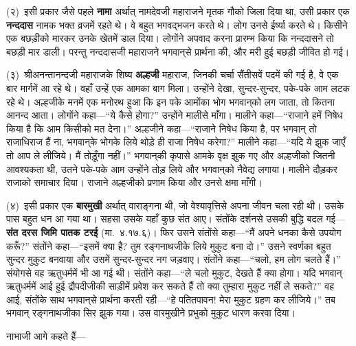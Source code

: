 \begin{sloppypar}\justifying{}
(२)~इसी प्रकार जैसे पहले \textbf{नामा} अर्थात् नामदेवजी महाराजने मृतक गौको जिला दिया था, उसी प्रकार एक \textbf{नन्ददास} नामक भक्त व्रजमें रहते थे। वे बहुत भगवद्भजन करते थे। लोग उनसे ईर्ष्या करते थे। किसीने एक बछड़ीको मारकर उनके खेतमें डाल दिया। लोगोंने अपवाद करना प्रारम्भ किया कि नन्ददासने तो बछड़ी मार डाली। परन्तु नन्ददासजी महाराजने भगवान्‌से प्रार्थना की, और मरी हुई बछड़ी जीवित हो गई।
\end{sloppypar}
\begin{sloppypar}\justifying{}
(३)~श्रीअनन्तानन्दजी महाराजके शिष्य \textbf{अल्हजी} महाराज, जिनकी चर्चा सैंतीसवें पदमें की गई है, वे एक बार मार्गमें आ रहे थे। वहाँ उन्हें एक आमका बाग मिला। उन्होंने देखा, सुन्दर-सुन्दर, पके-पके आम लटक रहे थे। अल्हजीके मनमें एक मनोरथ हुआ कि इन पके आमोंका भोग भगवान्‌को लग जाता, तो कितना आनन्द आता। लोगोंने कहा—“ये कैसे होगा?” उन्होंने मालीसे माँगा। मालीने कहा—“राजाने हमें निषेध किया है कि आम किसीको मत देना।” अल्हजीने कहा—“राजाने निषेध किया है, पर भगवान् तो राजाधिराज हैं ना, भगवान्‌के भोगके लिये थोड़े ही राजा निषेध करेगा?” मालीने कहा—“यदि ये झुक जाएँ तो आप ले लीजिये। मैं तोड़ूँगा नहीं।” भगवान्‌की कृपासे आमके वृक्ष झुक गए और अल्हजीको जितनी आवश्यकता थी, उतने पके-पके आम उन्होंने तोड़ लिये और भगवान्‌को नैवेद्य लगाया। मालीने दौड़कर राजाको समाचार दिया। राजाने अल्हजीको प्रणाम किया और उनसे क्षमा माँगी।
\end{sloppypar}
\begin{sloppypar}\justifying{}
(४)~इसी प्रकार एक \textbf{बारमुखी} अर्थात् वाराङ्गना थी, जो वेश्यावृत्तिसे अपना जीवन चला रही थी। उसके पास बहुत धन आ गया था। सहसा उसके यहाँ कुछ संत आए। संतोंके दर्शनसे उसकी बुद्धि बदल गई—\textbf{संत दरस जिमि पातक टरई} (मा.~४.१७.६)। फिर उसने संतोंसे कहा—“मैं अपने धनका कैसे उपयोग करूँ?” संतोंने कहा—“इसमें क्या है? तुम रङ्गनाथजीके लिये मुकुट बना दो।” उसने स्वर्णका बहुत सुन्दर मुकुट बनवाया और उसमें सुन्दर-सुन्दर नग जड़वाए। संतोंने कहा—“चलो, हम लोग चलते हैं।” संयोगसे वह ऋतुधर्ममें भी आ गई थी। संतोंने कहा—“ले चलो मुकुट, देखते हैं क्या होगा। यदि भगवान् ऋतुधर्ममें आई हुई द्रौपदीजीकी साड़ीमें प्रवेश कर सकते हैं तो क्या तुम्हारा मुकुट नहीं ले सकते?” वह आई, संतोंके साथ भगवान्‌से प्रार्थना करती रही—“हे पतितपावन! मेरा मुकुट ग्रहण कर लीजिये।” तब भगवान् रङ्गनाथजीका सिर झुक गया। उस वारमुखीने प्रभुको मुकुट धारण करवा दिया।
\end{sloppypar}
\begin{sloppypar}\justifying{}
नाभाजी आगे कहते हैं—
\end{sloppypar}

